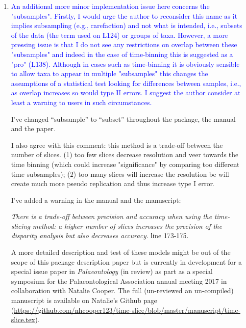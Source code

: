 \documentclass[12pt,letterpaper]{article}
\begin{document}
\begin{enumerate}
\item{\textcolor{blue}{An additional more minor implementation issue here concerns the "subsamples". Firstly, I would urge the author to reconsider this name as it implies subsampling (e.g., rarefaction) and not what is intended, i.e., subsets of the data (the term used on L124) or groups of taxa. However, a more pressing issue is that I do not see any restrictions on overlap between these "subsamples" and indeed in the case of time-binning this is suggested as a "pro" (L138). Although in cases such as time-binning it is obviously sensible to allow taxa to appear in multiple "subsamples" this changes the assumptions of a statistical test looking for differences between samples, i.e., as overlap increases so would type II errors. I suggest the author consider at least a warning to users in such circumstances.}}

I've changed ``subsample'' to ``subset'' throughout the package, the manual and the paper.

I also agree with this comment: this method is a trade-off between the number of slices.
(1) too few slices decrease resolution and veer towards the time binning (which could increase "significance" by comparing too different time subsamples);
(2) too many slices will increase the resolution be will create much more pseudo replication and thus increase type I error.

I've added a warning in the manual and the manuscript:

\textit{There is a trade-off between precision and accuracy when using the time-slicing method: a higher number of slices increases the precision of the disparity analysis but also decreases accuracy.} line 173-175.


A more detailed description and test of these models might be out of the scope of this package description paper but is currently in development for a special issue paper in \textit{Palaeontology} (in review) as part as a special symposium for the Palaeontological Association annual meeting 2017 in collaboration with Natalie Cooper.
The full (un-reviewed an un-compiled) manuscript is available on Natalie's Github page (\url{https://github.com/nhcooper123/time-slice/blob/master/manuscript/time-slice.tex}).



\end{enumerate}
\end{document}
